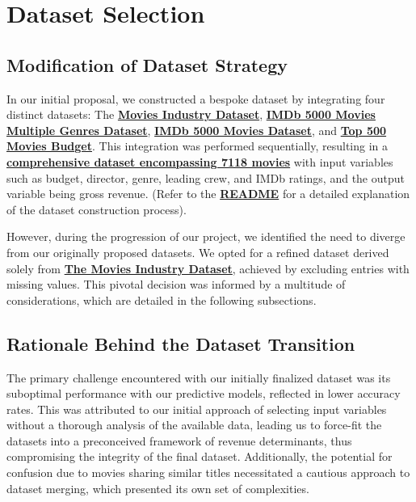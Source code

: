 \documentclass[conference]{IEEEtran}
\begin{document}
\section{Dataset Selection}
     \subsection{Modification of Dataset Strategy}
        In our initial proposal, we constructed a bespoke dataset by integrating four distinct datasets: The \href{https://www.kaggle.com/datasets/danielgrijalvas/movies}{\textbf{Movies Industry Dataset}}, \href{https://www.kaggle.com/datasets/rakkesharv/imdb-5000-movies-multiple-genres-dataset}{\textbf{IMDb 5000 Movies Multiple Genres Dataset}}, \href{https://www.kaggle.com/datasets/carolzhangdc/imdb-5000-movie-dataset}{\textbf{IMDb 5000 Movies Dataset}}, and \href{https://www.kaggle.com/datasets/mitchellharrison/top-500-movies-budget}{\textbf{Top 500 Movies Budget}}. This integration was performed sequentially, resulting in a \href{https://github.com/Vikranth3140/Movie-Revenue-Prediction/blob/main/old%20datasets/final_dataset.csv}{\textbf{comprehensive dataset encompassing 7118 movies}} with input variables such as budget, director, genre, leading crew, and IMDb ratings, and the output variable being gross revenue. (Refer to the \href{https://github.com/Vikranth3140/Movie-Revenue-Prediction/blob/main/old%20datasets/README.md}{\textbf{README}} for a detailed explanation of the dataset construction process).

        However, during the progression of our project, we identified the need to diverge from our originally proposed datasets. We opted for a refined dataset derived solely from \href{https://www.kaggle.com/datasets/danielgrijalvas/movies}{\textbf{The Movies Industry Dataset}}, achieved by excluding entries with missing values. This pivotal decision was informed by a multitude of considerations, which are detailed in the following subsections.

    \subsection{Rationale Behind the Dataset Transition}
        The primary challenge encountered with our initially finalized dataset was its suboptimal performance with our predictive models, reflected in lower accuracy rates. This was attributed to our initial approach of selecting input variables without a thorough analysis of the available data, leading us to force-fit the datasets into a preconceived framework of revenue determinants, thus compromising the integrity of the final dataset. Additionally, the potential for confusion due to movies sharing similar titles necessitated a cautious approach to dataset merging, which presented its own set of complexities.
\end{document}
